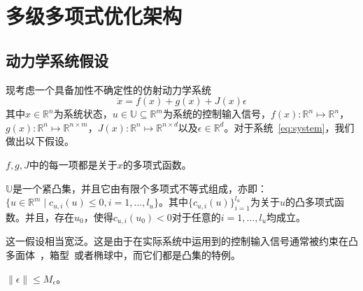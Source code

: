 
\chapter{多级多项式优化架构}
\label{sec:formulation}

\section{动力学系统假设}
现考虑一个具备加性不确定性的仿射动力学系统
\begin{equation}\label{eq:system}
    \dot{x} = f(x) + g(x) + J(x) \epsilon
\end{equation}
其中$x \in \mathbb{R}^n$为系统状态，$u \in \mathbb{U} \subseteq \mathbb{R}^m$为系统的控制输入信号，$f(x): \mathbb{R}^n \mapsto \mathbb{R}^n$，$g(x): \mathbb{R}^n \mapsto \mathbb{R}^{n \times m}$，$J(x): \mathbb{R}^n \mapsto \mathbb{R}^{n \times d}$以及$\epsilon \in \mathbb{R}^d$。对于系统~\eqref{eq:system}，我们做出以下假设。

\begin{assumption}[多项式系统]\label{assume:dynamics}
    $f, g, J$中的每一项都是关于$x$的多项式函数。
\end{assumption}

\begin{assumption}[凸多项式控制输入信号约束]\label{assume:control}
    $\mathbb{U}$是一个紧凸集，并且它由有限个多项式不等式组成，亦即：$\{ u \in \mathbb{R}^m \mid c_{u,i}(u) \le 0, i=1, \dots, l_u \}$。其中$\{ c_{u,i}(u) \}_{i=1}^{l_u}$为关于$u$的凸多项式函数。并且，存在$u_0$，使得$c_{u,i}(u_0) < 0$对于任意的$i = 1, \dots, l_u$均成立。
\end{assumption}
这一假设相当宽泛。这是由于在实际系统中运用到的控制输入信号通常被约束在凸多面体~\cite{dai2022arxiv-clfcbfsynveri}，箱型~\cite{zhao22arxiv-cbfsos}或者椭球中，而它们都是凸集的特例。

\begin{assumption}[不确定程度有界]\label{assume:epsilon}
    $\parallel \epsilon \parallel \le M_{\epsilon}$。
\end{assumption}

